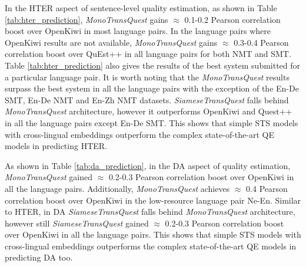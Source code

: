 In the HTER aspect of sentence-level quality estimation, as shown in Table \ref{tab:hter_prediction}, \textit{MonoTransQuest} gains $\approx$ 0.1-0.2 Pearson correlation boost over OpenKiwi in most language pairs. In the language pairs where OpenKiwi results are not available, \textit{MonoTransQuest} gains $\approx$ 0.3-0.4 Pearson correlation boost over QuEst++ in all language pairs for both NMT and SMT. Table \ref{tab:hter_prediction}  also gives the results of the best system submitted for a particular language pair. It is worth noting that the \textit{MonoTransQuest} results surpass the best system in all the language pairs with the exception of the En-De SMT, En-De NMT and En-Zh NMT datasets. \textit{SiameseTransQuest} falls behind \textit{MonoTransQuest} architecture, however it outperforms OpenKiwi and Quest++ in all the language pairs except En-De SMT. This shows that simple STS models with cross-lingual embeddings outperform the complex state-of-the-art QE models in predicting HTER. 


As shown in Table \ref{tab:da_prediction}, in the DA aspect of quality estimation, \textit{MonoTransQuest}  gained $\approx$ 0.2-0.3 Pearson correlation boost over OpenKiwi in all the language pairs. Additionally, \textit{MonoTransQuest} achieves $\approx$ 0.4 Pearson correlation boost over OpenKiwi in the low-resource language pair Ne-En. Similar to HTER, in DA \textit{SiameseTransQuest} falls behind \textit{MonoTransQuest} architecture, however still \textit{SiameseTransQuest} 
gained $\approx$ 0.2-0.3 Pearson correlation boost over OpenKiwi in all the language pairs. This shows that simple STS models with cross-lingual embeddings outperforms the complex state-of-the-art QE models in predicting DA too.



